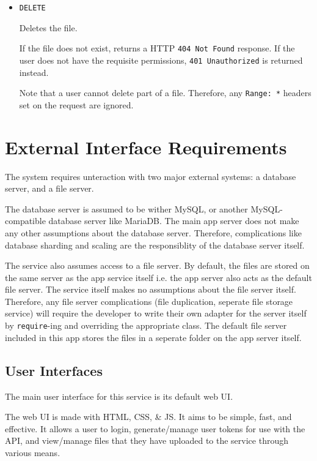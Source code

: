 \documentclass[12pt,a4paper]{report}
\begin{document}
\begin{itemize}
\begin{itemize}
		      \item \texttt{DELETE}

		            Deletes the file.

		            If the file does not exist, returns a HTTP \texttt{404 Not Found} response.
		            If the user does not have the requisite permissions, \texttt{401 Unauthorized} is returned instead.

		            Note that a user cannot delete part of a file.
		            Therefore, any \texttt{Range: *} headers set on the request are ignored.
	      \end{itemize}
\end{itemize}

\section{External Interface Requirements}\label{sec:external_interface_requirements}
The system requires unteraction with two major external systems: a database server, and a file server.

The database server is assumed to be wither MySQL, or another MySQL-compatible database server like MariaDB.
The main app server does not make any other assumptions about the database server.
Therefore, complications like database sharding and scaling are the responsiblity of the database server itself.

The service also assumes access to a file server.
By default, the files are stored on the same server as the app service itself i.e. the app server also acts as the default file server.
The service itself makes no assumptions about the file server itself.
Therefore, any file server complications (file duplication, seperate file storage service) will require the developer to write their own adapter for the server itself by \texttt{require}-ing and overriding the appropriate class.
The default file server included in this app stores the files in a seperate folder on the app server itself.
\subsection{User Interfaces}
The main user interface for this service is its default web UI.

The web UI is made with HTML, CSS, \& JS.
It aims to be simple, fast, and effective.
It allows a user to login, generate/manage user tokens for use with the API, and view/manage files that they have uploaded to the service through various means.
\end{document}
